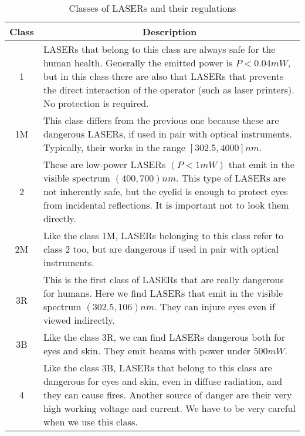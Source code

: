 \begin{table}[b!]
  \begin{tabular}{|c|p{12cm}|}
  \hline
  \multicolumn{1}{|c|}{\textbf{Class}} & \multicolumn{1}{c|}{\textbf{Description}} \\
  \hline
  
  1  &
  \acs{LASER}s that belong to this class are always safe for the human health. Generally the emitted power is $P < 0.04 mW$, but in this class there are also that \acs{LASER}s that prevents the direct interaction of the operator (such as laser printers). No protection is required. \\
  \hline
  
  1M &
  This class differs from the previous one because these are dangerous \acs{LASER}s, if used in pair with optical instruments. Typically, their works in the range $\left[302.5, 4000\right] nm$. \\
  \hline
  
  2  &
  These are low-power \acs{LASER}s $\left( P < 1 mW\right)$ that emit in the visible spectrum $\left( 400, 700 \right) nm$. This type of \acs{LASER}s are not inherently safe, but the eyelid is enough to protect eyes from incidental reflections. It is important not to look them directly. \\
  \hline
  
  2M &
  Like the class 1M, \acs{LASER}s belonging to this class refer to class 2 too, but are dangerous if used in pair with optical instruments. \\
  \hline
  
  3R &
  This is the first class of \acs{LASER}s that are really dangerous for humans. Here we find \acs{LASER}s that emit in the visible spectrum $\left(302.5, 106\right) nm$. They can injure eyes even if viewed indirectly. \\
  \hline
  
  3B &
  Like the class 3R, we can find \acs{LASER}s dangerous both for eyes and skin. They emit beams with power under $500 mW$. \\
  \hline
  
  4  &
  Like the class 3B, \acs{LASER}s that belong to this class are dangerous for eyes and skin, even in diffuse radiation, and they can cause fires. Another source of danger are their very high working voltage and current. We have to be very careful when we use this class. \\
  \hline
  \end{tabular}
    
  \caption{Classes of \acs{LASER}s and their regulations} 
  \label{tab:laser-classes}
\end{table}